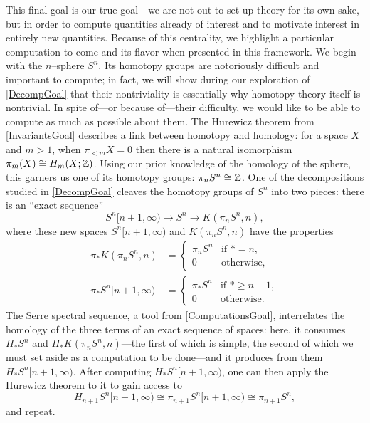 This final goal is our true goal---we are not out to set up theory for its own sake, but in order to compute quantities already of interest and to motivate interest in entirely new quantities.  Because of this centrality, we highlight a particular computation to come and its flavor when presented in this framework.  We begin with the $n$--sphere $S^n$.  Its homotopy groups are notoriously difficult and important to compute; in fact, we will show during our exploration of \eqref{DecompGoal} that their nontriviality is essentially why homotopy theory itself is nontrivial.  In spite of---or because of---their difficulty, we would like to be able to compute as much as possible about them.  The Hurewicz theorem from \eqref{InvariantsGoal} describes a link between homotopy and homology: for a space $X$ and $m > 1$, when $\pi_{< m} X = 0$ then there is a natural isomorphism $\pi_m(X) \cong H_m(X; \mathbb Z)$.  Using our prior knowledge of the homology of the sphere, this garners us one of its homotopy groups: $\pi_n S^n \cong \mathbb Z$.  One of the decompositions studied in \eqref{DecompGoal} cleaves the homotopy groups of $S^n$ into two pieces: there is an ``exact sequence'' \[S^n[n+1, \infty) \to S^n \to K(\pi_n S^n, n),\] where these new spaces $S^n[n+1, \infty)$ and $K(\pi_n S^n, n)$ have the properties
\begin{align*}
\pi_* K(\pi_n S^n, n) & = \begin{cases} \pi_n S^n & \text{if $* = n$}, \\ 0 & \text{otherwise}, \end{cases} \\
\pi_* S^n[n+1, \infty) & = \begin{cases} \pi_* S^n & \text{if $* \ge n + 1$}, \\ 0 & \text{otherwise}. \end{cases}
\end{align*}
The Serre spectral sequence, a tool from \eqref{ComputationsGoal}, interrelates the homology of the three terms of an exact sequence of spaces: here, it consumes $H_* S^n$ and $H_* K(\pi_n S^n, n)$---the first of which is simple, the second of which we must set aside as a computation to be done---and it produces from them $H_* S^n[n+1, \infty)$.  After computing $H_* S^n[n+1, \infty)$, one can then apply the Hurewicz theorem to it to gain access to \[H_{n+1} S^n[n+1, \infty) \cong \pi_{n+1} S^n[n+1, \infty) \cong \pi_{n+1} S^n,\] and repeat.




